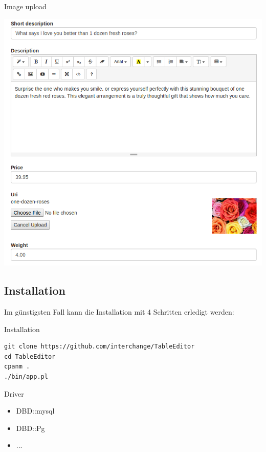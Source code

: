 \begin{frame}[plain]{Image upload}
  \begin{center}
    \includegraphics[width=\textwidth,height=1\textheight,keepaspectratio]{images/image-upload.png}
  \end{center}
\end{frame}

\subsection{Installation}
Im günstigsten Fall kann die Installation mit 4 Schritten
erledigt werden:

\begin{frame}[fragile]{Installation}
\begin{lstlisting}
git clone https://github.com/interchange/TableEditor
cd TableEditor
cpanm .
./bin/app.pl
\end{lstlisting}
\end{frame}

\begin{frame}[fragile]{Driver}
\begin{itemize}
\item DBD::mysql
\item DBD::Pg
\item ...
\end{itemize}
\end{frame}

